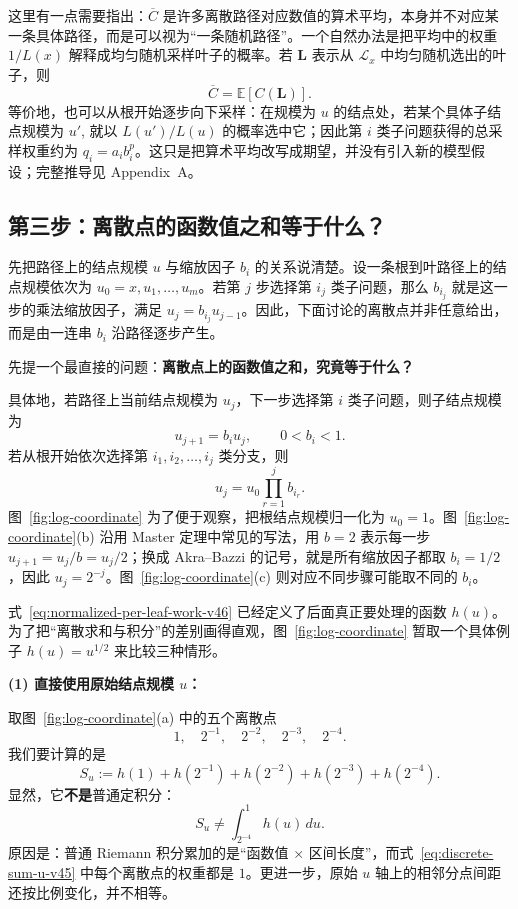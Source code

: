 \documentclass[11pt,a4paper]{article}
\begin{document}
这里有一点需要指出：$\overline C$ 是许多离散路径对应数值的算术平均，本身并不对应某一条具体路径，而是可以视为“一条随机路径”。一个自然办法是把平均中的权重 $1/L(x)$ 解释成均匀随机采样叶子的概率。若 $\mathbf L$ 表示从 $\mathcal L_x$ 中均匀随机选出的叶子，则
\[
\overline C=\mathbb E[C(\mathbf L)].
\]
等价地，也可以从根开始逐步向下采样：在规模为 $u$ 的结点处，若某个具体子结点规模为 $u'$, 就以 $L(u')/L(u)$ 的概率选中它；因此第 $i$ 类子问题获得的总采样权重约为 $q_i=a_i b_i^p$。这只是把算术平均改写成期望，并没有引入新的模型假设；完整推导见 Appendix~A。

\subsection{第三步：离散点的函数值之和等于什么？}
先把路径上的结点规模 $u$ 与缩放因子 $b_i$ 的关系说清楚。设一条根到叶路径上的结点规模依次为 $u_0=x,u_1,\ldots,u_m$。若第 $j$ 步选择第 $i_j$ 类子问题，那么 $b_{i_j}$ 就是这一步的乘法缩放因子，满足 $u_j=b_{i_j}u_{j-1}$。因此，下面讨论的离散点并非任意给出，而是由一连串 $b_i$ 沿路径逐步产生。

先提一个最直接的问题：\textbf{离散点上的函数值之和，究竟等于什么？}

具体地，若路径上当前结点规模为 $u_j$，下一步选择第 $i$ 类子问题，则子结点规模为
\begin{equation}
u_{j+1}=b_i u_j,\qquad 0<b_i<1.
\label{eq:ui-bi-relation-v46}
\end{equation}
若从根开始依次选择第 $i_1,i_2,\ldots,i_j$ 类分支，则
\begin{equation}
u_j=u_0\prod_{r=1}^{j}b_{i_r}.
\label{eq:path-size-product-v46}
\end{equation}
图~\ref{fig:log-coordinate} 为了便于观察，把根结点规模归一化为 $u_0=1$。图~\ref{fig:log-coordinate}(b) 沿用 Master 定理中常见的写法，用 $b=2$ 表示每一步 $u_{j+1}=u_j/b=u_j/2$；换成 Akra--Bazzi 的记号，就是所有缩放因子都取 $b_i=1/2$，因此 $u_j=2^{-j}$。图~\ref{fig:log-coordinate}(c) 则对应不同步骤可能取不同的 $b_i$。

式~\eqref{eq:normalized-per-leaf-work-v46} 已经定义了后面真正要处理的函数 $h(u)$。为了把“离散求和与积分”的差别画得直观，图~\ref{fig:log-coordinate} 暂取一个具体例子 $h(u)=u^{1/2}$ 来比较三种情形。

\noindent\textbf{(1) 直接使用原始结点规模 $u$：}

取图~\ref{fig:log-coordinate}(a) 中的五个离散点
\[
1,\quad 2^{-1},\quad 2^{-2},\quad 2^{-3},\quad 2^{-4}.
\]
我们要计算的是
\begin{equation}
S_u
:=h(1)+h(2^{-1})+h(2^{-2})+h(2^{-3})+h(2^{-4}).
\label{eq:discrete-sum-u-v45}
\end{equation}
显然，它\textbf{不是}普通定积分：
\begin{equation}
S_u
\neq
\int_{2^{-4}}^{1} h(u)\,du.
\label{eq:sum-not-riemann-u-v45}
\end{equation}
原因是：普通 Riemann 积分累加的是“函数值 $\times$ 区间长度”，而式~\eqref{eq:discrete-sum-u-v45} 中每个离散点的权重都是 $1$。更进一步，原始 $u$ 轴上的相邻分点间距还按比例变化，并不相等。
\end{document}
